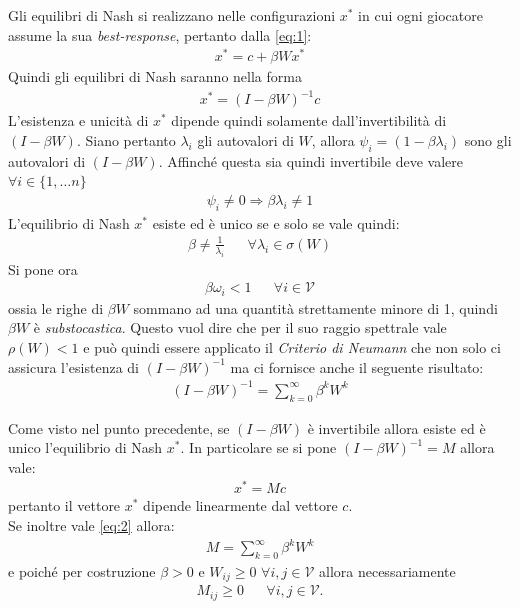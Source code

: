 \documentclass[11pt,largemargins]{homework}
\begin{document}
\begin{alphaparts}
  \questionpart %
  Gli equilibri di Nash si realizzano nelle configurazioni \(x^*\) in cui ogni giocatore assume la sua \textit{best-response}, pertanto dalla \ref{eq:1}:
  \begin{gather*}
    x^* = c + \beta W x^* 
  \end{gather*}
  Quindi gli equilibri di Nash saranno nella forma
  \begin{gather*}
    x^* = (I-\beta W)^{-1}c
  \end{gather*}
  L'esistenza e unicità di \(x^*\) dipende quindi solamente dall'invertibilità di \((I-\beta W)\). Siano pertanto \(\lambda_i\) gli autovalori di \(W\), allora \(\psi_i = (1 - \beta \lambda_i)\) sono gli autovalori di \((I-\beta W)\). Affinché questa sia quindi invertibile deve valere \(\forall i \in \{1, \dots n\}\) 
  \begin{gather*}
    \psi_i \neq 0 \Rightarrow \beta \lambda_i \neq 1
  \end{gather*}
  L'equilibrio di Nash \(x^*\) esiste ed è unico se e solo se vale quindi:
  \begin{align*}
    \beta \neq \frac{1}{\lambda_i} && \forall \lambda_i \in \sigma(W)
  \end{align*} 
  Si pone ora \begin{align} \label{eq:2}
    \beta \omega_i < 1 && \forall i \in \mathcal{V}
  \end{align} ossia le righe di \(\beta W\) sommano ad una quantità strettamente minore di 1, quindi \(\beta W\) è \textit{substocastica}. Questo vuol dire che per il suo raggio spettrale vale \(\rho(W)<1\) e può quindi essere applicato il \textit{Criterio di Neumann} che non solo ci assicura l'esistenza di \((I-\beta W)^{-1}\) ma ci fornisce anche il seguente risultato:
  \begin{gather*}
    (I-\beta W)^{-1} =  \sum \limits_{k=0}^{\infty} \beta^k W^k
  \end{gather*}

  \questionpart %
  Come visto nel punto precedente, se \((I-\beta W)\) è invertibile allora esiste ed è unico l'equilibrio di Nash \(x^*\). In particolare se si pone \((I-\beta W)^{-1} = M \) allora vale:
  \begin{gather*}
    x^* = Mc
  \end{gather*}
  pertanto il vettore \(x^*\) dipende linearmente dal vettore \(c\).\\
  Se inoltre vale \ref{eq:2} allora:
  \begin{gather*}
    M= \sum \limits_{k=0}^{\infty} \beta^k W^k
  \end{gather*}
  e poiché per costruzione \(\beta > 0\) e \(W_{ij}\geq 0 \) \(\forall i,j \in \mathcal{V}\) allora necessariamente
  \begin{align*}
    M_{ij} \geq 0 && \forall i,j \in \mathcal{V} .
  \end{align*}



\end{alphaparts}
\end{document}
